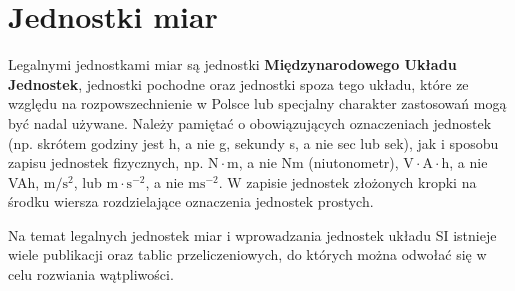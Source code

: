 \section{Jednostki miar}Legalnymi jednostkami miar są jednostki \textbf{Międzynarodowego Układu Jednostek}, jednostki pochodne oraz jednostki spoza tego układu, które ze względu na rozpowszechnienie w Polsce lub specjalny charakter zastosowań mogą być nadal używane. Należy pamiętać o obowiązujących oznaczeniach jednostek (np. skrótem godziny jest h, a nie g, sekundy s, a nie sec lub sek), jak i sposobu zapisu jednostek fizycznych, np. $\mathrm{N}\cdot \mathrm{m}$, a nie Nm (niutonometr), $\mathrm{V}\cdot\mathrm{A}\cdot\mathrm{h}$, a nie VAh, $\mathrm{m}\slash \mathrm{s}^2$, lub $\mathrm{m}\cdot \mathrm{s}^{-2}$, a nie $\mathrm{ms}^{-2}$. W zapisie jednostek złożonych kropki na środku wiersza rozdzielające oznaczenia jednostek prostych. 

Na temat legalnych jednostek miar i wprowadzania jednostek układu SI istnieje wiele publikacji oraz tablic przeliczeniowych, do których można odwołać się w celu rozwiania wątpliwości.

